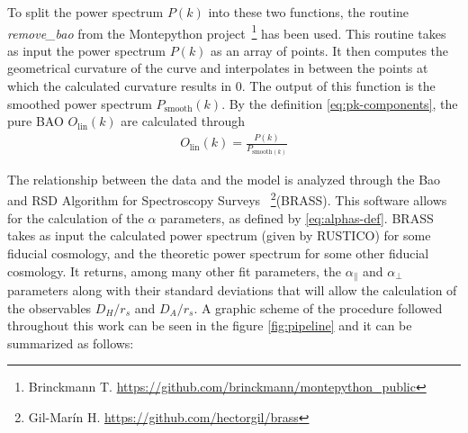  To split the power spectrum $P(k)$ into these two functions, the routine \textit{remove\_bao} from the Montepython project~\footnote{Brinckmann T. \url{https://github.com/brinckmann/montepython_public}} has been used. This routine takes as input the power spectrum $P(k)$ as an array of points. It then computes the geometrical curvature of the curve and interpolates in between the points at which the calculated curvature results in 0. The output of this function is the smoothed power spectrum $P_{\text{smooth}}(k)$. By the definition \eqref{eq:pk-components}, the pure BAO  $O_{\text{lin}}(k)$ are calculated through 
\begin{align}
	O_{\text{lin}}(k) = \frac{P(k)}{P_{\text{smooth}(k)}}
\end{align}

The relationship between the data and the model is analyzed through the Bao and RSD Algorithm for Spectroscopy Surveys ~\footnote{Gil-Marín H. \url{https://github.com/hectorgil/brass}}(BRASS). This software allows for the calculation of the $\alpha$ parameters, as defined by \eqref{eq:alphas-def}. BRASS takes as input the calculated power spectrum (given by RUSTICO) for some  fiducial cosmology, and the theoretic power spectrum for some other fiducial cosmology. It returns, among many other fit parameters, the $\alpha_\parallel$ and $\alpha_\perp$ parameters along with their standard deviations that will allow the calculation of the observables $D_H/r_s$ and $D_A /r_s$. A graphic scheme of the procedure followed throughout this work can be seen in the figure \ref{fig:pipeline} and it can be summarized as follows:
